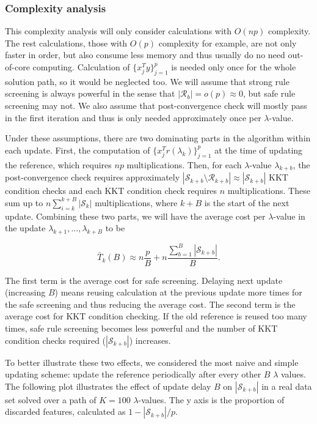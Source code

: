 \subsubsection{Complexity analysis}

This complexity analysis will only consider calculations with $O(np)$ complexity. The rest calculations, those with $O(p)$ complexity for example, are not only faster in order, but also consume less memory and thus usually do no need out-of-core computing. Calculation of $\{x_j^Ty\}_{j=1}^p$ is needed only once for the whole solution path, so it would be neglected too. We will assume that strong rule screening is always powerful in the sense that $|\mathcal{R}_b|=o(p)\approx0$, but safe rule screening may not. We also assume that post-convergence check will mostly pass in the first iteration and thus is only needed approximately once per $\lambda$-value.

Under these assumptions, there are two dominating parts in the algorithm within each update. First, the computation of $\{x_j^Tr(\lambda_k)\}_{j=1}^p$ at the time of updating the reference, which requires $np$ multiplications. Then, for each $\lambda$-value $\lambda_{k+b}$, the post-convergence check requires approximately $|\mathcal{S}_{k+b}\setminus\mathcal{R}_{k+b}|\approx|\mathcal{S}_{k+b}|$ KKT condition checks and each KKT condition check requires $n$ multiplications. These sum up to $n\sum_{i=k}^{k+B}|\mathcal{S}_k|$ multiplications, where $k+B$ is the start of the next update. Combining these two parts, we will have the average cost per $\lambda$-value in the update $\lambda_{k+1},...,\lambda_{k+B}$ to be

\begin{equation}
    \label{eq:cost}
    \bar{T}_k(B) \approx n\frac{p}{B}+n\frac{\sum_{b=1}^B|\mathcal{S}_{k+b}|}{B}.
\end{equation}

The first term is the average cost for safe screening. Delaying next update (increasing $B$) means reusing calculation at the previous update more times for the safe screening and thus reducing the average cost. The second term is the average cost for KKT condition checking. If the old reference is reused too many times, safe rule screening becomes less powerful and the number of KKT condition checks required ($|\mathcal{S}_{k+b}|$) increases.

To better illustrate these two effects, we considered the most naive and simple updating scheme: update the reference periodically after every other $B$ $\lambda$ values. The following plot illustrates the effect of update delay $B$ on $|\mathcal{S}_{k+b}|$ in a real data set solved over a path of $K=100$ $\lambda$-values. The y axis is the proportion of discarded features, calculated as $1-|\mathcal{S}_{k+b}|/p$.

